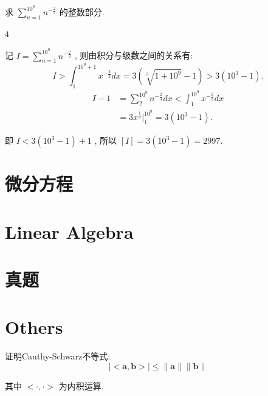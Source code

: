 \documentclass[12pt]{article}
\newenvironment{solution}[2][Solution]{\begin{trivlist}
\item[\hskip \labelsep {\bfseries #1}]}{\end{trivlist}}
\newenvironment{problem}[2][Problem]{\begin{trivlist}
\item[\hskip \labelsep {\bfseries #1}\hskip \labelsep {\bfseries #2.}]}{\end{trivlist}}
\begin{document}
\vspace{3cm}



\begin{problem}{4}
    求 $ \displaystyle \sum_{n=1}^{10^9} n^{-\frac{2}{3}} $ 的整数部分.
\end{problem}

\begin{solution} \textbf{4}

    记 $I = \sum_{n=1}^{10^9} n^{- \frac{2}{3}}$ , 则由积分与级数之间的关系有:
    \[
        I > \int_{1}^{10^9 + 1} x^{-\frac{2}{3}}dx = 3(\sqrt[3]{1 + 10^9} - 1) > 3(10^3 -1).    
    \]
    \[
        \begin{aligned}
        I - 1 &= \sum_{2}^{10^9} n^{-\frac{2}{3}}dx < \int_{1}^{10^9} x^{-\frac{2}{3}}dx   \\
        &= 3x^{\frac{1}{3}} \Big |_{1}^{10^9} = 3(10^3 -1).
        \end{aligned}
    \]

    即 $I < 3(10^3 -1) + 1$ , 所以 $[I] = 3(10^3 - 1) = 2997$.
\end{solution}

\vspace{3cm}



\pagebreak




\section{微分方程}


\section{Linear Algebra}



\section{真题}





\section{Others}


\begin{problem}{1}
证明Cauthy-Schwarz不等式:
\[
\boldsymbol{\mid<a,b>\mid \leq \parallel a \parallel\parallel b \parallel}
\]

其中 $<\cdot,\cdot>$ 为内积运算.
\end{problem}
\end{document}
